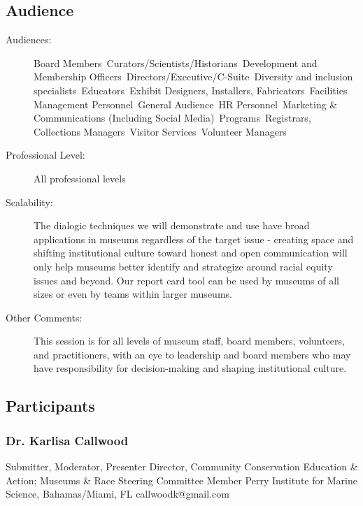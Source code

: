 \documentclass{report}
\begin{document}
              \subsection*{Audience}
                \begin{description}
                  \item [Audiences:]Board Members~Curators/Scientists/Historians~Development and Membership Officers~Directors/Executive/C-Suite~Diversity and inclusion specialists~Educators~Exhibit Designers, Installers, Fabricators~Facilities Management Personnel~General Audience~HR Personnel~Marketing \& Communications (Including Social Media)~Programs~Registrars, Collections Managers~Visitor Services~Volunteer Managers~
                  \item[Professional Level:]All professional levels~
                \item[Scalability:] The dialogic techniques we will demonstrate and use have broad applications in museums regardless of the target issue - creating space and shifting institutional culture toward honest and open communication will only help museums better identify and strategize around racial equity issues and beyond. Our report card tool can be used by museums of all sizes or even by teams within larger museums.

							
              \item[Other Comments:] This session is for all levels of museum staff, board members, volunteers, and practitioners, with an eye to leadership and board members who may have responsibility for decision-making and shaping institutional culture.
              \end{description}
            \subsection*{Participants}
              \subsubsection*{ Dr. Karlisa  Callwood }
              Submitter, Moderator, Presenter\newline
              Director, Community Conservation Education \& Action; Museums \& Race Steering Committee Member\newline
              Perry Institute for Marine Science, Bahamas/Miami, FL
              \newline
              callwoodk@gmail.com\newline
              
\end{document}
